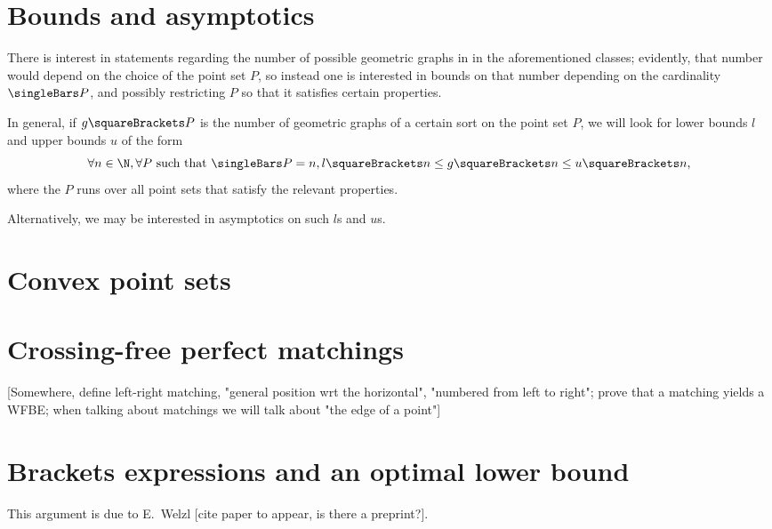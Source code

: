 \documentclass[10pt, a4paper, twoside]{basestyle}
\begin{document}
\section{Bounds and asymptotics}
There is interest in statements regarding the number of possible geometric graphs in
in the aforementioned classes; evidently, that number would depend on the choice of
the point set $P$, so instead one is interested in bounds on that number depending
on the cardinality $\Cardinality P$, and possibly restricting $P$ so that it satisfies
certain properties.

In general, if $g\of P$ is the number of geometric graphs of a certain sort on the point
set $P$, we will look for lower bounds $l$ and upper bounds $u$ of the form\[
\forall n\in \N, \forall P \text{ such that } \Cardinality P = n,
l \of n \leq g \of n \leq u \of n \text,\]
where the $P$ runs over all point sets that satisfy the relevant properties.

Alternatively, we may be interested in asymptotics on such $l$s and $u$s.
\section{Convex point sets}
\section{Crossing-free perfect matchings}

[Somewhere, define left-right matching, "general position wrt the horizontal",
"numbered from left to right"; prove that a matching yields a WFBE;
when talking about matchings we will talk about "the edge of a point"]

\section{Brackets expressions and an optimal lower bound}
This argument is due to E.~Welzl [cite paper to appear, is there a preprint?].
\end{document}

